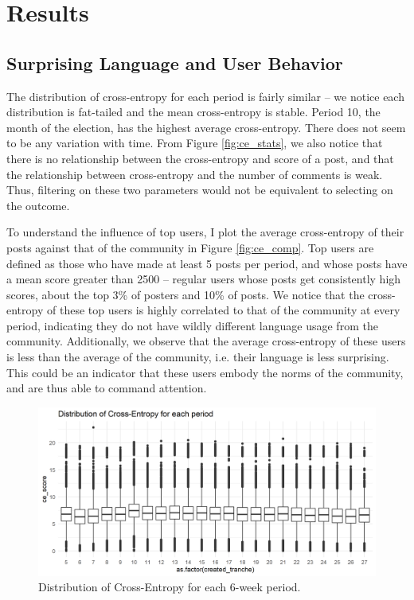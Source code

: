 \section{Results}

\subsection*{Surprising Language and User Behavior}

The distribution of cross-entropy for each period is fairly similar -- we notice each distribution is fat-tailed and the mean cross-entropy is stable. Period 10, the month of the election, has the highest average cross-entropy. There does not seem to be any variation with time. From Figure \ref{fig:ce_stats}, we also notice that there is no relationship between the cross-entropy and score of a post, and that the relationship between cross-entropy and the number of comments is weak. Thus, filtering on these two parameters would not be equivalent to selecting on the outcome. 

To understand the influence of top users, I plot the average cross-entropy of their posts against that of the community in  Figure \ref{fig:ce_comp}. Top users are defined as those who have made at least 5 posts per period, and whose posts have a mean score greater than 2500 -- regular users whose posts get consistently high scores, about the top 3\% of posters and 10\% of posts. We notice that the cross-entropy of these top users is highly correlated to that of the community at every period, indicating they do not have wildly different language usage from the community. Additionally, we observe that the average cross-entropy of these users is less than the average of the community, i.e. their language is less surprising. This could be an indicator that these users embody the norms of the community, and are thus able to command attention. 

\begin{figure}[h]%

    \centering

    \includegraphics[width=0.8\linewidth]{figures/ce_boxplot.png}
    \caption{Distribution of Cross-Entropy for each 6-week period.}%

    \label{fig:ce_boxplot}%

\end{figure}

